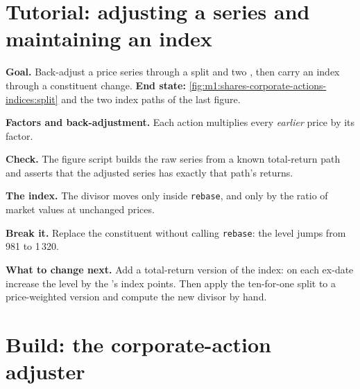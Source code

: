 \section{Tutorial: adjusting a series and maintaining an index}\label{tut:m1:shares-corporate-actions-indices:adjust}

\begin{tutorial}
\textbf{Goal.} Back-adjust a price series through a split and two ,
then carry an index through a constituent change. \textbf{End state:}
\cref{fig:m1:shares-corporate-actions-indices:split} and the two index paths
of the last figure.
\begin{tutsteps}
\item \textbf{Factors and back-adjustment.} Each action multiplies every
\emph{earlier} price by its factor.
\label{lst:m1:shares-corporate-actions-indices:factors}
\label{lst:m1:shares-corporate-actions-indices:backadj}
\item \textbf{Check.} The figure script builds the raw series from a known
total-return path and asserts that the adjusted series has exactly that
path's returns.
\item \textbf{The index.} The divisor moves only inside \texttt{rebase}, and
only by the ratio of market values at unchanged prices.
\label{lst:m1:shares-corporate-actions-indices:index}
\item \textbf{Break it.} Replace the constituent without calling
\texttt{rebase}: the level jumps from 981 to 1\,320.
\end{tutsteps}
\textbf{What to change next.} Add a total-return version of the index: on
each ex-date increase the level by the 's index points. Then apply
the ten-for-one split to a price-weighted version and compute the new
divisor by hand.
\end{tutorial}

\section{Build: the corporate-action adjuster}\label{bld:m1:shares-corporate-actions-indices:adjuster}

